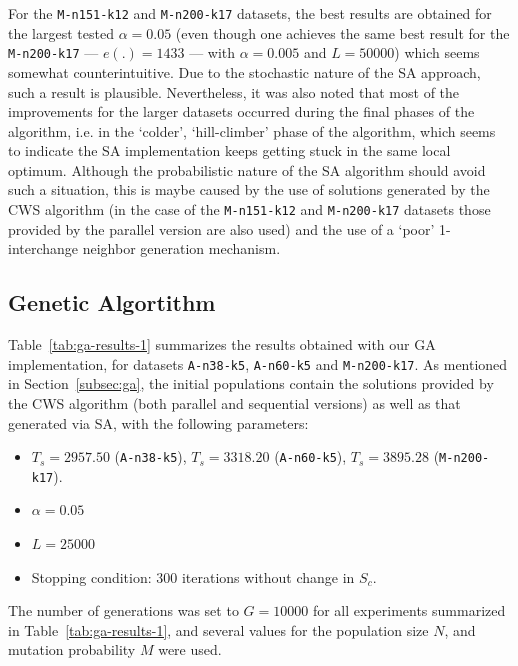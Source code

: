 For the \verb?M-n151-k12? and 
\verb?M-n200-k17? datasets, the best results are obtained for the largest 
tested $\alpha = 0.05$ (even though one achieves the same best result for the 
\verb?M-n200-k17? --- $e(.) = 1433$ --- with $\alpha = 0.005$ and $L = 50000$) 
which seems somewhat counterintuitive. Due to the stochastic 
nature of the SA approach, such a result is plausible. Nevertheless, it was also 
noted that most of the improvements for the larger datasets occurred during the 
final phases of the algorithm, i.e. in the `colder', `hill-climber' phase of 
the algorithm, which seems to indicate the SA implementation keeps getting 
stuck in the same local optimum. Although the probabilistic nature of the SA 
algorithm should avoid such a situation, this is maybe caused by the use of 
solutions generated by the CWS algorithm (in 
the case of the \verb?M-n151-k12? and \verb?M-n200-k17? datasets those provided 
by the parallel version are also used) and the use of a `poor' 1-interchange 
neighbor generation mechanism.\vertbreak

\subsection{Genetic Algortithm}
\label{subsec:gen-al}

Table~\ref{tab:ga-results-1} summarizes the results obtained with our GA 
implementation, for datasets \verb?A-n38-k5?, \verb?A-n60-k5? and 
\verb?M-n200-k17?. As mentioned in Section~\ref{subsec:ga}, the initial 
populations contain the solutions provided by the CWS algorithm (both parallel 
and sequential versions) as well as that generated via SA, with the following 
parameters:

\begin{itemize}
    \item $T_s = 2957.50$ (\verb?A-n38-k5?), $T_s = 3318.20$ (\verb?A-n60-k5?), $T_s = 3895.28$ (\verb?M-n200-k17?).
    \item $\alpha = 0.05$
    \item $L = 25000$
    \item Stopping condition: 300 iterations without change in $S_c$.
\end{itemize}\vertbreak

The number of generations was set to $G = 10000$ for all experiments summarized 
in Table~\ref{tab:ga-results-1}, and several values for the population size $N$, 
and mutation probability $M$ were used.\vertbreak


